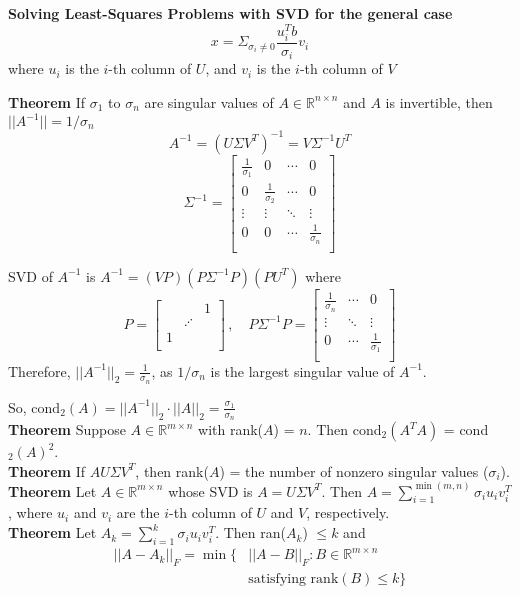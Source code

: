 \documentclass[9pt]{article}
\begin{document}
\begin{multicols}{3}
\hdashrule{\linewidth}{0.5pt}{0.2mm 1mm}
\vspace{0.05cm}
\textbf{Solving Least-Squares Problems with SVD for the general case}
\[
x = \Sigma_{\sigma_i \neq 0} \frac{u_i^T b}{\sigma_i}v_i
\]
where $u_i$ is the $i$-th column of $U$, and $v_i$ is the $i$-th column of $V$
\hdashrule{\linewidth}{0.5pt}{1mm 1mm}

\textbf{Theorem} If $\sigma_1$ to $\sigma_n$ are singular values of $A \in \mathbb{R}^{n \times n}$ and $A$ is invertible, then $||A^{-1}|| = 1/\sigma_n$
\[
A^{-1} = (U \Sigma V^T)^{-1} = V \Sigma^{-1} U^T
\]
\[
\Sigma^{-1} = 
\begin{bmatrix}
    \frac{1}{\sigma_1} & 0 & \cdots & 0\\
    0 & \frac{1}{\sigma_2} & \cdots & 0\\
    \vdots & \vdots & \ddots & \vdots\\
    0 & 0 & \cdots & \frac{1}{\sigma_n}\\
\end{bmatrix}
\]


SVD of $A^{-1}$ is $A^{-1} = (VP)(P \Sigma^{-1}P)(PU^T)$
where 
\[
P = \begin{bmatrix}
    & & 1\\
    & \iddots & \\
    1 & & \\
\end{bmatrix} \, ,
\quad    
P\Sigma^{-1}P = 
\begin{bmatrix}
    \frac{1}{\sigma_n} & \cdots & 0\\
    \vdots & \ddots & \vdots \\
    0 & \cdots & \frac{1}{\sigma_1}\\
\end{bmatrix}
\]
Therefore, $||A^{-1}||_2 = \frac{1}{\sigma_n}$, as $1/\sigma_n$ is the largest singular value of $A^{-1}.$

So, $\text{cond}_2(A) = ||A^{-1}||_2 \cdot ||A||_2 = \frac{\sigma_1}{\sigma_n}$\\

\textbf{Theorem} Suppose $A \in \mathbb{R}^{m \times n}$ with rank($A$) = $n$. Then cond$_2(A^TA)$ = cond$_2(A)^2$.\\
\textbf{Theorem} If $A  U \Sigma V^T$, then rank($A$) = the number of nonzero singular values ($\sigma_i$).\\
\textbf{Theorem} Let $A \in \mathbb{R}^{m \times n}$ whose SVD is $A = U \Sigma V^T$. Then $A = \sum_{i=1}^{\min(m,n)} \sigma_i u_i v_i^T$, where $u_i$ and $v_i$ are the $i$-th column of $U$ and $V$, respectively.\\
\textbf{Theorem} Let $A_k = \sum_{i=1}^k \sigma_i u_i v_i^T$. Then ran($A_k$) $\leq k$ and
\[
\begin{aligned}
||A - A_k||_F = \min\{ &||A-B||_F : B \in \mathbb{R}^{m \times n}\\
&\text{satisfying rank}(B) \leq k\}
\end{aligned}
\]


\end{multicols}
\end{document}
